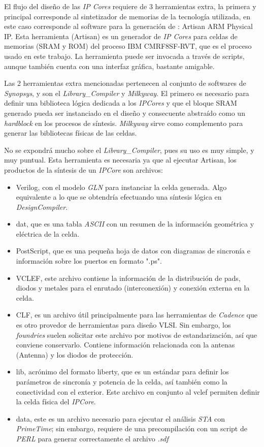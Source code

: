 El flujo del diseño de las \textit{IP Cores}  requiere de 3 herramientas extra, la primera y principal corresponde al sintetizador de memorias de la tecnología utilizada, en este caso corresponde al software para la generación de : Artisan ARM Physical IP. Esta herramienta (Artisan) es un generador de \textit{IP Cores} para celdas de memorias (SRAM y ROM) del proceso IBM CMRF8SF-RVT, que es el proceso usado en este trabajo. La herramienta puede ser invocada a través de scripts, aunque también cuenta con una interfaz gráfica, bastante amigable.

Las 2 herramientas extra mencionadas pertenecen al conjunto de softwares de \textit{Synopsys}, y son el \textit{Library\_Compiler} y \textit{Milkyway}. El primero es necesario para definir una biblioteca lógica dedicada a los \textit{IPCores} y que el bloque SRAM generado pueda ser instanciado en el diseño y consecuente abstraído como un \textit{hardblock} en los procesos de síntesis. \textit{Milkyway} sirve como complemento para generar las bibliotecas físicas de las celdas.

No se expondrá mucho sobre el \textit{Library\_Compiler}, pues su uso es muy simple, y muy puntual. Esta herramienta es necesaria ya que al ejecutar Artisan, los productos de la síntesis de un \textit{IPCore} son archivos:

\begin{itemize}
\item Verilog, con el modelo \textit{GLN} para instanciar la celda generada. Algo equivalente a lo que se obtendría efectuando una síntesis lógica en \textit{DesignCompiler}.
\item dat, que es una tabla \textit{ASCII} con un resumen de la información geométrica y eléctrica de la celda.
\item PostScript, que es una pequeña hoja de datos con diagramas de sincronía e información sobre los puertos en formato ".ps".
\item VCLEF, este archivo contiene la información de la distribución de pads, diodos y metales para el enrutado (interconexión) y conexión externa en la celda.
\item CLF, es un archivo útil principalmente para las herramientas de \textit{Cadence} que es otro provedor de herramientas para diseño VLSI.  Sin embargo, los \textit{foundries} suelen solicitar este archivo por motivos de estandarización, así que conviene conservarlo. Contiene información relacionada con la antenas (Antenna) y los diodos de protección.
\item lib, acrónimo del formato liberty, que es un estándar para definir los parámetros de sincronía y potencia de la celda, así también como la conectividad con el exterior. Este archivo en conjunto al vclef permiten definir la celda física del \textit{IPCore}.
\item data, este es un archivo necesario para ejecutar el análisis \textit{STA} con \textit{PrimeTime}; sin embargo, requiere de una precompilación con un script de \textit{PERL} para generar correctamente el archivo \textit{.sdf}
\end{itemize}


